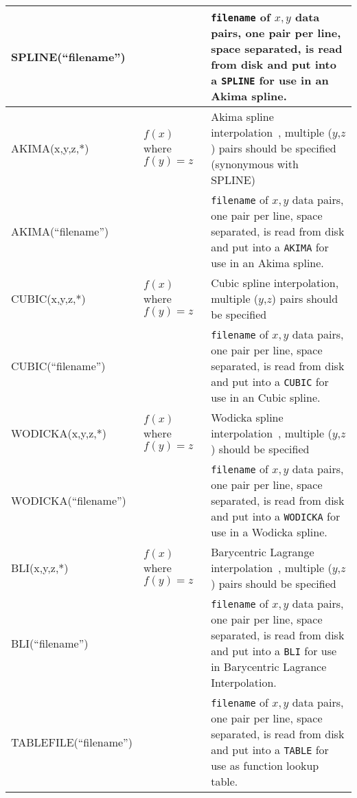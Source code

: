 {\begin{longtable}{>{\raggedright\small}m{1in}>{\raggedright\small}m{2in}>{\raggedright\let\\\tabularnewline\small}m{2in}}
    SPLINE(``filename'') &
    & \texttt{filename} of $x,y$ data pairs, one pair per line, space separated, is 
      read from disk and put into a \texttt{SPLINE} for use in an Akima spline. \\ \hline

    AKIMA(x,y,z,*)
    & $f(x)$ where $f(y)=z$ & Akima spline interpolation~\cite{10.1145/321607.321609}, multiple ($y$,$z$) pairs should be specified (synonymous with SPLINE) \\ \hline

    AKIMA(``filename'') &
    & \texttt{filename} of $x,y$ data pairs, one pair per line, space separated, is 
      read from disk and put into a \texttt{AKIMA} for use in an Akima spline. \\ \hline

    CUBIC(x,y,z,*)
    & $f(x)$ where $f(y)=z$ & Cubic spline interpolation, multiple ($y$,$z$) pairs should be specified \\ \hline

    CUBIC(``filename'') &
    & \texttt{filename} of $x,y$ data pairs, one pair per line, space separated, is 
      read from disk and put into a \texttt{CUBIC} for use in an Cubic spline. \\ \hline

    WODICKA(x,y,z,*)
    & $f(x)$ where $f(y)=z$ & Wodicka spline interpolation~\cite{Engeln1996}, multiple ($y$,$z$) should be specified \\ \hline

    WODICKA(``filename'') &
    & \texttt{filename} of $x,y$ data pairs, one pair per line, space separated, is 
      read from disk and put into a \texttt{WODICKA} for use in a Wodicka spline. \\ \hline

    BLI(x,y,z,*)
    & $f(x)$ where $f(y)=z$ & Barycentric Lagrange interpolation~\cite{Berrut_barycentriclagrange}, multiple ($y$,$z$) pairs should be specified \\ \hline

    BLI(``filename'') &
    & \texttt{filename} of $x,y$ data pairs, one pair per line, space separated, is 
      read from disk and put into a \texttt{BLI} for use in Barycentric Lagrance Interpolation. \\ \hline
    
    TABLEFILE(``filename'') &  
    & \texttt{filename} of $x,y$ data pairs, one pair per line, space separated, is 
      read from disk and put into a \texttt{TABLE} for use as function lookup table. \\ \hline


\end{longtable}}
